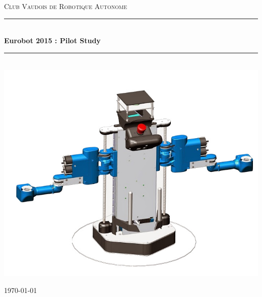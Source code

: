\begin{titlepage}

\newcommand{\HRule}{\rule{\linewidth}{0.5mm}} %

\center %
\textsc{\LARGE Club Vaudois de Robotique Autonome}\\[1.5cm] 

\HRule \\[0.4cm]
{ \huge \bfseries Eurobot 2015 : Pilot Study}\\[0.4cm] %
\HRule \\[1.5cm]
 
\includegraphics[width=\textwidth]{images/Debra_IV_1}\\[2cm] 


\vfill %

{\large \today}
\end{titlepage}


